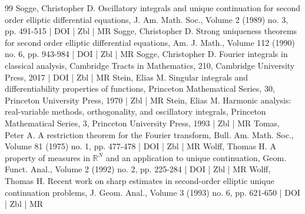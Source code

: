 \begin{thebibliography}{99}
 Sogge, Christopher D. Oscillatory integrals and unique continuation for second order elliptic differential equations, J. Am. Math. Soc., Volume 2 (1989) no. 3, pp. 491-515 | DOI | Zbl | MR
 Sogge, Christopher D. Strong uniqueness theorems for second order elliptic differential equations, Am. J. Math., Volume 112 (1990) no. 6, pp. 943-984 | DOI | Zbl | MR
 Sogge, Christopher D. Fourier integrals in classical analysis, Cambridge Tracts in Mathematics, 210, Cambridge University Press, 2017 | DOI | Zbl | MR
 Stein, Elias M. Singular integrals and differentiability properties of functions, Princeton Mathematical Series, 30, Princeton University Press, 1970 | Zbl | MR
 Stein, Elias M. Harmonic analysis: real-variable methods, orthogonality, and oscillatory integrals, Princeton Mathematical Series, 3, Princeton University Press, 1993 | Zbl | MR
 Tomas, Peter A. A restriction theorem for the Fourier transform, Bull. Am. Math. Soc., Volume 81 (1975) no. 1, pp. 477-478 | DOI | Zbl | MR
 Wolff, Thomas H. A property of measures in $\mathbb{R}^{N}$ and an application to unique continuation, Geom. Funct. Anal., Volume 2 (1992) no. 2, pp. 225-284 | DOI | Zbl | MR
 Wolff, Thomas H. Recent work on sharp estimates in second-order elliptic unique continuation problems, J. Geom. Anal., Volume 3 (1993) no. 6, pp. 621-650 | DOI | Zbl | MR
\end{thebibliography}
